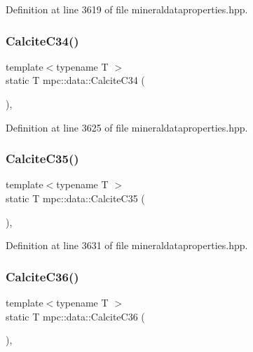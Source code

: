 Definition at line 3619 of file mineraldataproperties.\+hpp.

\mbox{\label{namespacempc_1_1data_af5b18800a581d138b2b32d05ff8acd35}} 
\subsubsection{\texorpdfstring{Calcite\+C34()}{CalciteC34()}}
{\footnotesize\ttfamily template$<$typename T $>$ \\
static T mpc\+::data\+::\+Calcite\+C34 (\begin{DoxyParamCaption}{ }\end{DoxyParamCaption})\hspace{0.3cm}{\ttfamily [inline]}, {\ttfamily [static]}}



Definition at line 3625 of file mineraldataproperties.\+hpp.

\mbox{\label{namespacempc_1_1data_a31298cef33b1d5d22758a42bdaa1062c}} 
\subsubsection{\texorpdfstring{Calcite\+C35()}{CalciteC35()}}
{\footnotesize\ttfamily template$<$typename T $>$ \\
static T mpc\+::data\+::\+Calcite\+C35 (\begin{DoxyParamCaption}{ }\end{DoxyParamCaption})\hspace{0.3cm}{\ttfamily [inline]}, {\ttfamily [static]}}



Definition at line 3631 of file mineraldataproperties.\+hpp.

\mbox{\label{namespacempc_1_1data_a1f8106f756de7273c5997f148f738481}} 
\subsubsection{\texorpdfstring{Calcite\+C36()}{CalciteC36()}}
{\footnotesize\ttfamily template$<$typename T $>$ \\
static T mpc\+::data\+::\+Calcite\+C36 (\begin{DoxyParamCaption}{ }\end{DoxyParamCaption})\hspace{0.3cm}{\ttfamily [inline]}, {\ttfamily [static]}}



